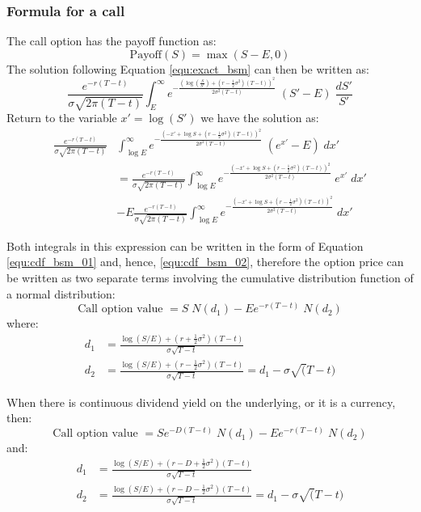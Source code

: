 \subsubsection{Formula for a call}
The call option has the payoff function as:
\begin{equation}
    \text{Payoff}(S) = \max(S-E, 0)
\end{equation}
The solution following Equation \ref{equ:exact_bsm} can then be written as:
\begin{equation}
    \frac{e^{-r(T-t)}}{\sigma \sqrt{2 \pi (T-t)}} \int_E^\infty e^{-\frac{\left( \log(\frac{S}{S'}) + \left( r - \frac{1}{2} \sigma^2 \right)(T-t) \right)^2}{2 \sigma^2 (T-t)}} \; (S' - E) \; \frac{dS'}{S'}
\end{equation}
Return to the variable $x' = \log(S')$ we have the solution as:
\begin{align}
    \frac{e^{-r(T-t)}}{\sigma \sqrt{2 \pi (T-t)}} & \int_{\log E}^\infty e^{-\frac{\left( -x' + \log S + \left( r - \frac{1}{2} \sigma^2 \right)(T-t) \right)^2}{2 \sigma^2 (T-t)}} \; (e^{x'} - E) \; dx' \\
    &= \frac{e^{-r(T-t)}}{\sigma \sqrt{2 \pi (T-t)}} \int_{\log E}^\infty e^{-\frac{\left( -x' + \log S + \left( r - \frac{1}{2} \sigma^2 \right)(T-t) \right)^2}{2 \sigma^2 (T-t)}} \; e^{x'} \; dx' \\
    &-E \frac{e^{-r(T-t)}}{\sigma \sqrt{2 \pi (T-t)}} \int_{\log E}^\infty e^{-\frac{\left( -x' + \log S + \left( r - \frac{1}{2} \sigma^2 \right)(T-t) \right)^2}{2 \sigma^2 (T-t)}} \; dx' 
\end{align}

Both integrals in this expression can be written in the form of Equation \ref{equ:cdf_bsm_01} and, hence, \ref{equ:cdf_bsm_02}, therefore the option price can be written as two separate terms involving the cumulative distribution function of a normal distribution:
\begin{equation}
    \text{Call option value } = S \; N(d_1) - Ee^{-r(T-t)} \; N(d_2)  
\end{equation}
where:
\begin{align}
    d_1 &= \frac{\log(S/E) + \left( r + \frac{1}{2} \sigma^2 \right)(T-t)}{\sigma \sqrt{T-t}} \\
    d_2 &= \frac{\log(S/E) + \left( r - \frac{1}{2} \sigma^2 \right)(T-t)}{\sigma \sqrt{T-t}} = d_1 - \sigma \sqrt(T-t)
\end{align}

When there is continuous dividend yield on the underlying, or it is a currency, then:
\begin{equation}
    \text{Call option value } = S e^{-D(T-t)} \; N(d_1) - E e^{-r(T-t)} \; N(d_2)
\end{equation}
and:
\begin{align}
    d_1 &= \frac{\log(S/E) + \left( r - D + \frac{1}{2} \sigma^2 \right)(T-t)}{\sigma \sqrt{T-t}} \\
    d_2 &= \frac{\log(S/E) + \left( r - D - \frac{1}{2} \sigma^2 \right)(T-t)}{\sigma \sqrt{T-t}} = d_1 - \sigma \sqrt(T-t)
\end{align}


